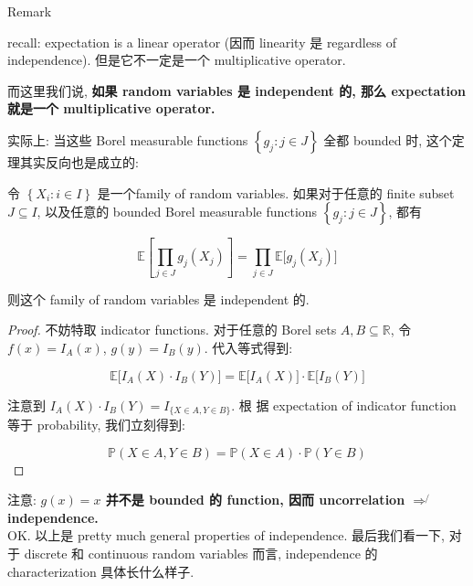 \documentclass{qlnotes-export}
\begin{document}
\begin{qlremark}{Remark}

recall: expectation is a linear operator (因而 linearity 是 regardless of independence). 但是它不一定是一个 multiplicative operator.

而这里我们说, \textbf{如果 random variables 是 independent 的, 那么 expectation 就是一个 multiplicative operator.}

\end{qlremark}

实际上: 当这些 Borel measurable functions \(\left\{ {g_{j}:j \in J} \right\}\) 全都 bounded 时, 这个定理其实反向也是成立的:

\begin{theorem}\label{thm-03-joint-conditional-distribution-theorem-004}

令 \(\left\{ {X_{i}:i \in I} \right\}\) 是一个family of random variables. 如果对于任意的 finite subset \(J \subseteq I\), 以及任意的 bounded Borel measurable functions \(\left\{ {g_{j}:j \in J} \right\}\), 都有

\[{\mathbb{E}}\left\lbrack {\prod\limits_{j \in J}g_{j}(X_{j})} \right\rbrack = \prod\limits_{j \in J}{\mathbb{E}}\lbrack g_{j}(X_{j})\rbrack\]

则这个 family of random variables 是 independent 的.

\end{theorem}

\begin{proof}

不妨特取 indicator functions. 对于任意的 Borel sets \(A,B \subseteq {\mathbb{R}}\), 令 \(f(x) = I_{A}(x)\), \(g(y) = I_{B}(y)\). 代入等式得到:

\[{\mathbb{E}}\lbrack I_{A}(X) \cdot I_{B}(Y)\rbrack = {\mathbb{E}}\lbrack I_{A}(X)\rbrack \cdot {\mathbb{E}}\lbrack I_{B}(Y)\rbrack\]

注意到 \(I_{A}(X) \cdot I_{B}(Y) = I_{\{{X \in A,Y \in B}\}}\). 根 据 expectation of indicator function 等于 probability, 我们立刻得到:

\[{\mathbb{P}}(X \in A,Y \in B) = {\mathbb{P}}(X \in A) \cdot {\mathbb{P}}(Y \in B)\]

\end{proof}

注意: \textbf{\(g(x) = x\) 并不是 bounded 的 function, 因而 uncorrelation \(\operatorname{\Longrightarrow\not{}}\) independence.}\\
OK. 以上是 pretty much general properties of independence. 最后我们看一下, 对于 discrete 和 continuous random variables 而言, independence 的 characterization 具体长什么样子.
\end{document}
